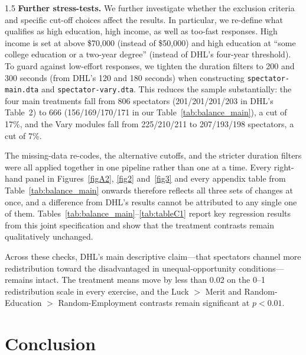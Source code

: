 \documentclass[12pt,a4paper]{article}
\begin{document}
\begin{spacing}{1.5}
\medskip
\noindent\textbf{Further stress-tests.}
We further investigate whether the exclusion criteria and specific cut-off choices affect the results. In particular, we re-define what qualifies as high education, high income, as well as too-fast responses. High income is set at above \$70,000 (instead of \$50,000) and high education at “some college education or a two-year degree” (instead of DHL's four-year threshold). To guard against low-effort responses, we tighten the duration filters to 200 and 300 seconds (from DHL's 120 and 180 seconds) when constructing \texttt{spectator-main.dta} and \texttt{spectator-vary.dta}. This reduces the sample substantially: the four main treatments fall from 806 spectators (201/201/201/203 in DHL's Table~2) to 666 (156/169/170/171 in our Table~\ref{tab:balance_main}), a cut of 17\%, and the Vary modules fall from 225/210/211 to 207/193/198 spectators, a cut of 7\%.

The missing-data re-codes, the alternative cutoffs, and the stricter duration filters were all applied together in one pipeline rather than one at a time. Every right-hand panel in Figures~\ref{figA2}, \ref{fig2} and~\ref{fig3} and every appendix table from Table~\ref{tab:balance_main} onwards therefore reflects all three sets of changes at once, and a difference from DHL's results cannot be attributed to any single one of them. Tables~\ref{tab:balance_main}--\ref{tab:tableC1} report key regression results from this joint specification and show that the treatment contrasts remain qualitatively unchanged.

\medskip
Across these checks, DHL's main descriptive claim---that spectators channel more redistribution toward the disadvantaged in unequal-opportunity conditions---remains intact. The treatment means move by less than 0.02 on the 0--1 redistribution scale in every exercise, and the Luck $>$ Merit and Random-Education $>$ Random-Employment contrasts remain significant at $p<0.01$.
\end{spacing}
 
 


\section{Conclusion}
\end{document}
